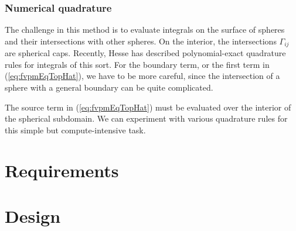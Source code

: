 \documentclass[12pt]{article}
\newcommand{\labelSec}[1]{\label{sec:#1}}
\newcommand{\refEq}[1]{(\ref{eq:#1})}
\begin{document}
\subsubsection*{Numerical quadrature}

The challenge in this method is to evaluate integrals on the surface of spheres and their intersections with other spheres. On the interior, the 
intersections $\Gamma_{ij}$ are spherical caps. Recently, Hesse has described polynomial-exact quadrature rules for integrals of this sort\cite{Hesse2012}.
For the boundary term, or the first term in \refEq{fvpmEqTopHat}, we have to be more careful, since the intersection of a sphere with a general boundary can 
be quite complicated.

The source term in \refEq{fvpmEqTopHat} must be evaluated over the interior of the spherical subdomain. We can experiment with various 
quadrature rules for this simple but compute-intensive task.

\section{Requirements}\labelSec{Requirements}

\section{Design}\labelSec{Design}



\end{document}
